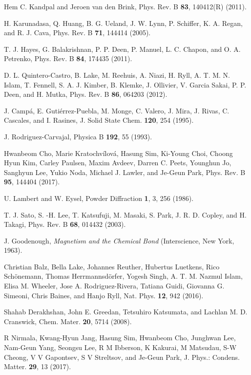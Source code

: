 \documentclass[aps,prl,reprint,amsmath,amssymb,superscriptaddress,showpacs]{revtex4-1}
\begin{document}
\begin{thebibliography}{99}
 Hem C. Kandpal and Jeroen van den Brink, Phys. Rev. B \textbf{83}, 140412(R) (2011).

 H. Karunadasa, Q. Huang, B. G. Ueland, J. W. Lynn, P. Schiffer, K. A. Regan, and R. J. Cava, Phys. Rev. B \textbf{71}, 144414 (2005).

 T. J. Hayes, G. Balakrishnan, P. P. Deen, P. Manuel, L. C. Chapon, and O. A. Petrenko, Phys. Rev. B \textbf{84}, 174435 (2011).

 D. L. Quintero-Castro, B. Lake, M. Reehuis, A. Niazi, H. Ryll, A. T. M. N. Islam, T. Fennell, S. A. J. Kimber, B. Klemke, J. Ollivier, V. Garcia Sakai, P. P. Deen, and H. Mutka, Phys. Rev. B \textbf{86}, 064203 (2012).

 J. Camp\'a, E. Guti\'errez-Puebla, M. Monge, C. Valero, J. Mira, J. Rivas, C. Cascales, and I. Rasines, J. Solid State Chem. \textbf{120}, 254 (1995).

 J. Rodriguez-Carvajal, Physica B \textbf{192}, 55 (1993).

 Hwanbeom Cho, Marie Kratochv\'ilov\'a, Hasung Sim, Ki-Young Choi, Choong Hyun Kim, Carley Paulsen, Maxim Avdeev, Darren C. Peets, Younghun Jo, Sanghyun Lee, Yukio Noda, Michael J. Lawler, and Je-Geun Park, Phys. Rev. B \textbf{95}, 144404 (2017).

 U. Lambert and W. Eysel, Powder Diffraction \textbf{1}, 3, 256 (1986).

 T. J. Sato, S. -H. Lee, T. Katsufuji, M. Masaki, S. Park, J. R. D. Copley, and H. Takagi, Phys. Rev. B \textbf{68}, 014432 (2003).

 J. Goodenough, \textit{Magnetism and the Chemical Bond} (Interscience, New York, 1963).

 Christian Balz, Bella Lake, Johannes Reuther, Hubertus Luetkens, Rico Sch\"{o}nemann, Thomas Herrmannsd\"{o}rfer, Yogesh Singh, A. T. M. Nazmul Islam, Elisa M. Wheeler, Jose A. Rodriguez-Rivera, Tatiana Guidi, Giovanna G. Simeoni, Chris Baines, and Hanjo Ryll, Nat. Phys. \textbf{12}, 942 (2016).

 Shahab Derakhshan, John E. Greedan, Tetsuhiro Katsumata, and Lachlan M. D. Cranswick, Chem. Mater. \textbf{20}, 5714 (2008).

 R Nirmala, Kwang-Hyun Jang, Hasung Sim, Hwanbeom Cho, Junghwan Lee, Nam-Geun Yang, Seongsu Lee, R M Ibberson, K Kakurai, M Matsudau, S-W Cheong, V V Gapontsev, S V Streltsov, and Je-Geun Park, J. Phys.: Condens. Matter. \textbf{29}, 13 (2017).


\end{thebibliography}
\end{document}
